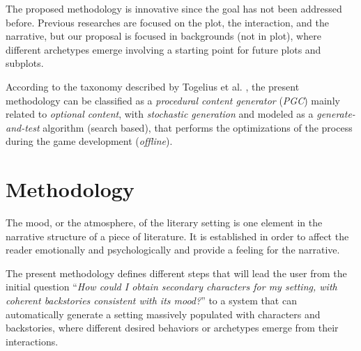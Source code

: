 \documentclass{sig-alternate}
\begin{document}
The proposed methodology is innovative since the goal has not been addressed before. Previous researches are focused on the plot, the interaction, and the narrative, but our proposal is focused in backgrounds (not in plot), where different archetypes emerge involving a starting point for future plots and subplots.


According to the taxonomy described by Togelius et al. \cite{Togelius2011}, the present methodology can be classified as a \textit{procedural content generator} (\textit{PGC})
mainly related to \textit{optional content}, with \textit{stochastic generation}
and modeled as a \textit{generate-and-test} algorithm (search based), that
performs the optimizations of the process during the game development (\textit{offline}).






%
%

\section{Methodology}
\label{sec:methodology}

The mood, or the atmosphere, of the literary setting is one element in the narrative structure of a piece of literature. It is established in order to affect the reader emotionally and psychologically and provide a feeling for the narrative.


The present methodology defines different steps that will lead the user from the initial question ``\textit{How could I obtain secondary characters for my setting, with coherent backstories consistent with its mood?}'' to a system that can automatically generate a setting massively populated with characters and backstories, where different desired behaviors or archetypes emerge from their interactions.
\end{document}
